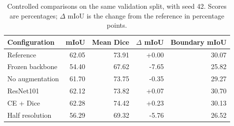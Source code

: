 \begin{table}[htbp]
\centering\small
\caption{Controlled comparisons on the same validation split, with seed 42. Scores are percentages; $\Delta$ mIoU is the change from the reference in percentage points.}
\label{tab:ablation}
\begin{tabular}{lrrrr}
\toprule
Configuration & mIoU & Mean Dice & $\Delta$ mIoU & Boundary mIoU\\
\midrule
Reference & 62.05 & 73.91 & +0.00 & 30.07\\
Frozen backbone & 54.40 & 67.62 & -7.65 & 25.82\\
No augmentation & 61.70 & 73.75 & -0.35 & 29.27\\
ResNet101 & 62.12 & 73.82 & +0.07 & 30.70\\
CE + Dice & 62.28 & 74.42 & +0.23 & 30.13\\
Half resolution & 56.29 & 69.32 & -5.76 & 26.52\\
\bottomrule
\end{tabular}
\end{table}

